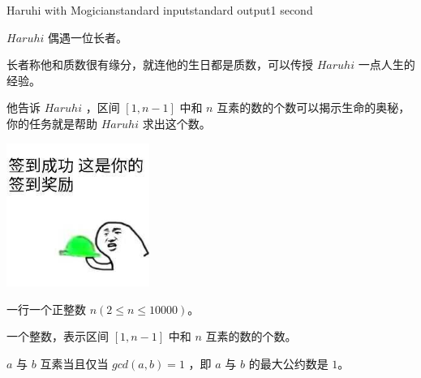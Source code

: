 \begin{problem}{Haruhi with Mogician}{standard input}{standard output}{1 second}

$Haruhi$ 偶遇一位长者。

长者称他和质数很有缘分，就连他的生日都是质数，可以传授 $Haruhi$ 一点人生的经验。

他告诉 $Haruhi$ ，区间 $[1,n-1]$ 中和 $n$ 互素的数的个数可以揭示生命的奥秘，你的任务就是帮助 $Haruhi$ 求出这个数。

\begin{center}
\includegraphics[width=0.35\textwidth]{pics/M.jpg}
\end{center}


\InputFile

一行一个正整数 $n(2 \leq n \leq 10000)$。

\OutputFile

一个整数，表示区间 $[1,n-1]$ 中和 $n$ 互素的数的个数。

\Example
\begin{example}
%
\end{example}

\Note

$a$ 与 $b$ 互素当且仅当 $gcd(a,b)=1$ ，即 $a$ 与 $b$ 的最大公约数是 $1$。

\end{problem}
